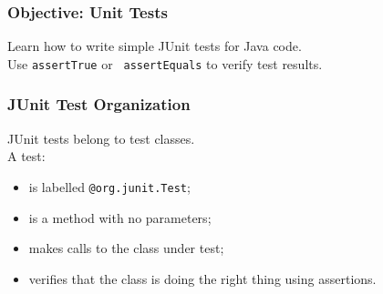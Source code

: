 \begin{frame}
\frametitle{Objective: Unit Tests}

\begin{changemargin}{1.5cm}

Learn how to write simple JUnit 
tests for Java code.\\[1em]

Use {\tt assertTrue} or {\tt
  assertEquals} to verify test results.
\end{changemargin}

\end{frame}

\begin{frame}
\frametitle{JUnit Test Organization}

\large
\begin{changemargin}{1cm}
JUnit tests belong to test classes.\\[1em]

A test:
\begin{itemize}
\item is labelled {\tt @org.junit.Test};
\item is a method with no parameters;
\item makes calls to the class under test;
\item verifies that the class is doing the right thing using assertions.
\end{itemize}

\end{changemargin}
\end{frame}

